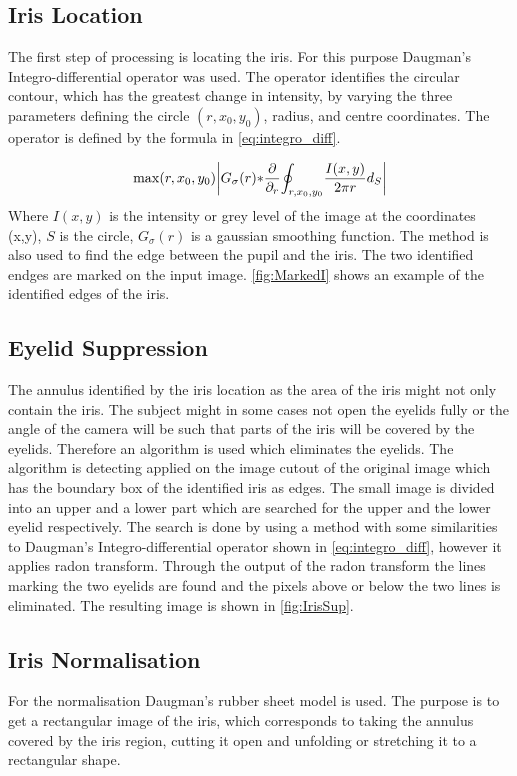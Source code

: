\subsection{Iris Location}
The first step of processing is locating the iris. For this purpose Daugman's Integro-differential operator was used. The operator identifies the circular contour, which has the greatest change in intensity, by varying the three parameters defining the circle $(r,x_0,y_0)$, radius, and centre coordinates. The operator is defined by the formula in \autoref{eq:integro_diff}.

\begin{equation}\label{eq:integro_diff}
	\max(r,x_{0},y_{0}){\left|G_{\sigma}{(r)*}{\partial\over \partial_{r}}{\oint_{r,x_{0},y_{0}}}{{I(x,y)\over 2\pi r}d_{S}}\right|}
\end{equation}
Where $I(x,y)$ is the intensity or grey level of the image at the coordinates (x,y), $S$ is the circle, $G_{\sigma}{(r)}$ is a gaussian smoothing function.
The method is also used to find the edge between the pupil and the iris. The two identified endges are marked on the input image. \autoref{fig:MarkedI} shows an example of the identified edges of the iris. 

\subsection{Eyelid Suppression}
The annulus identified by the iris location as the area of the iris might not only contain the iris. The subject might in some cases not open the eyelids fully or the angle of the camera will be such that parts of the iris will be covered by the eyelids. Therefore an algorithm is used which eliminates the eyelids. 
The algorithm is detecting applied on the image cutout of the original image which has the boundary box of the identified iris as edges. The small image is divided into an upper and a lower part which are searched for the upper and the lower eyelid respectively. The search is done by using a method with some similarities to Daugman's Integro-differential operator shown in \autoref{eq:integro_diff}, however it applies radon transform. Through the output of the radon transform the lines marking the two eyelids are found and the pixels above or below the two lines is eliminated. The resulting image is shown in \autoref{fig:IrisSup}.

\subsection{Iris Normalisation}
For the normalisation Daugman's rubber sheet model is used. The purpose is to get a rectangular image of the iris, which corresponds to taking the annulus covered by the iris region, cutting it open and unfolding or stretching it to a rectangular shape. 

